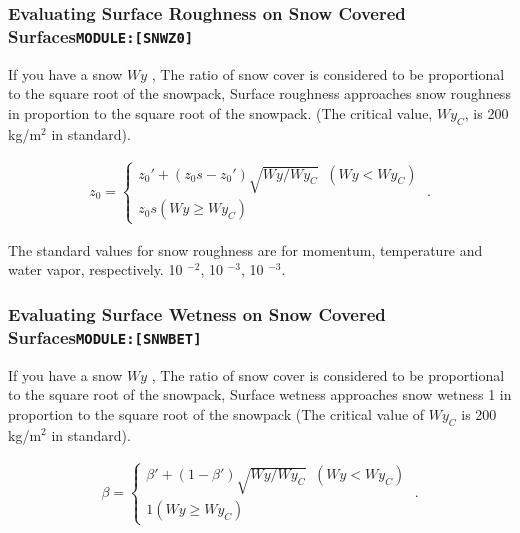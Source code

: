 \hypertarget{evaluating-surface-roughness-on-snow-covered-surfacesmodulesnwz0}{%
\subsubsection{\texorpdfstring{Evaluating Surface Roughness on Snow
Covered
Surfaces\texttt{MODULE:{[}SNWZ0{]}}}{Evaluating Surface Roughness on Snow Covered SurfacesMODULE:{[}SNWZ0{]}}}\label{evaluating-surface-roughness-on-snow-covered-surfacesmodulesnwz0}}

If you have a snow \(Wy\) , The ratio of snow cover is considered to be
proportional to the square root of the snowpack, Surface roughness
approaches snow roughness in proportion to the square root of the
snowpack. (The critical value, \(Wy_C\), is 200 kg/m\(^2\) in standard).

\begin{eqnarray}
  z_0 = \left\{ 
  \begin{array}{ll}
    z_0' + (z_0s-z_0')\sqrt{Wy/Wy_{C}}  \;\;   (Wy < Wy_{C}) \\
    z_0s                                       (Wy \ge Wy_{C})
  \end{array}
  \right. \; .
\end{eqnarray}

The standard values for snow roughness are for momentum, temperature and
water vapor, respectively. 10 \(^{-2}\), 10 \(^{-3}\), 10 \(^{-3}\).

\hypertarget{evaluating-surface-wetness-on-snow-covered-surfacesmodulesnwbet}{%
\subsubsection{\texorpdfstring{Evaluating Surface Wetness on Snow
Covered
Surfaces\texttt{MODULE:{[}SNWBET{]}}}{Evaluating Surface Wetness on Snow Covered SurfacesMODULE:{[}SNWBET{]}}}\label{evaluating-surface-wetness-on-snow-covered-surfacesmodulesnwbet}}

If you have a snow \(Wy\) , The ratio of snow cover is considered to be
proportional to the square root of the snowpack, Surface wetness
approaches snow wetness 1 in proportion to the square root of the
snowpack (The critical value of \(Wy_C\) is 200 kg/m\(^2\) in standard).

\begin{eqnarray}
  \beta = \left\{ 
  \begin{array}{ll}
    \beta' + (1-\beta')\sqrt{Wy/Wy_{C}}  \;\;   (Wy < Wy_{C}) \\
    1                                           (Wy \ge Wy_{C})
  \end{array}
  \right. \; .
\end{eqnarray}

